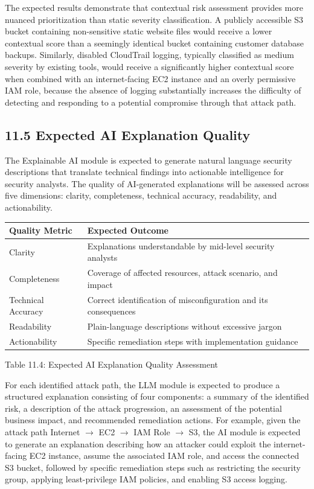 The expected results demonstrate that contextual risk assessment provides more nuanced prioritization than static severity classification. A publicly accessible S3 bucket containing non-sensitive static website files would receive a lower contextual score than a seemingly identical bucket containing customer database backups. Similarly, disabled CloudTrail logging, typically classified as medium severity by existing tools, would receive a significantly higher contextual score when combined with an internet-facing EC2 instance and an overly permissive IAM role, because the absence of logging substantially increases the difficulty of detecting and responding to a potential compromise through that attack path.

\subsection{11.5 Expected AI Explanation Quality}

The Explainable AI module is expected to generate natural language security descriptions that translate technical findings into actionable intelligence for security analysts. The quality of AI-generated explanations will be assessed across five dimensions: clarity, completeness, technical accuracy, readability, and actionability.

\begin{longtable}[]{@{}ll@{}}
\toprule\noalign{}
Quality Metric & Expected Outcome \\
\midrule\noalign{}
\endhead
\bottomrule\noalign{}
\endlastfoot
Clarity & Explanations understandable by mid-level security analysts \\
Completeness & Coverage of affected resources, attack scenario, and impact \\
Technical Accuracy & Correct identification of misconfiguration and its consequences \\
Readability & Plain-language descriptions without excessive jargon \\
Actionability & Specific remediation steps with implementation guidance \\
\end{longtable}

Table 11.4: Expected AI Explanation Quality Assessment

For each identified attack path, the LLM module is expected to produce a structured explanation consisting of four components: a summary of the identified risk, a description of the attack progression, an assessment of the potential business impact, and recommended remediation actions. For example, given the attack path Internet $\rightarrow$ EC2 $\rightarrow$ IAM Role $\rightarrow$ S3, the AI module is expected to generate an explanation describing how an attacker could exploit the internet-facing EC2 instance, assume the associated IAM role, and access the connected S3 bucket, followed by specific remediation steps such as restricting the security group, applying least-privilege IAM policies, and enabling S3 access logging.

